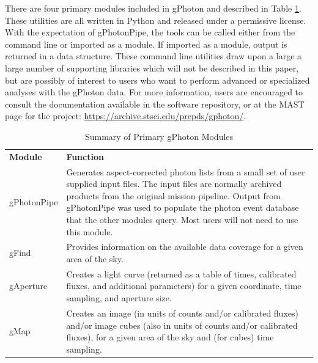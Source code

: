 \documentclass[5p]{elsarticle}
\begin{document}
There are four primary modules included in gPhoton and described in Table \ref{moduledesc}. These utilities are all written in Python and released under a permissive license. With the expectation of gPhotonPipe, the tools can be called either from the command line or imported as a module. If imported as a module, output is returned in a data structure. These command line utilities draw upon a large a large number of supporting libraries which will not be described in this paper, but are possibly of interest to users who want to perform advanced or specialized analyses with the gPhoton data.  For more information, users are encouraged to consult the documentation available in the software repository, or at the MAST page for the project: \url{https://archive.stsci.edu/prepds/gphoton/}.

\begin{table}
\begin{tabular}{|p{2cm}|p{6cm}|}
\hline
	{\bf Module} & {\bf Function}\\
	gPhotonPipe & Generates aspect-corrected photon lists from a small set of user supplied input files.  The input files are normally archived products from the original mission pipeline. Output from gPhotonPipe was used to populate the photon event database that the other modules query.  Most users will not need to use this module.\\\hline
	gFind & Provides information on the available data coverage for a given area of the sky.\\\hline
	gAperture & Creates a light curve (returned as a table of times, calibrated fluxes, and additional parameters) for a given coordinate, time sampling, and aperture size.\\\hline
	gMap & Creates an image (in units of counts and/or calibrated fluxes) and/or image cubes (also in units of counts and/or calibrated fluxes), for a given area of the sky and (for cubes) time sampling.\\
\hline
\end{tabular}
\caption{Summary of Primary gPhoton Modules}
\label{moduledesc}
\end{table}
\end{document}
